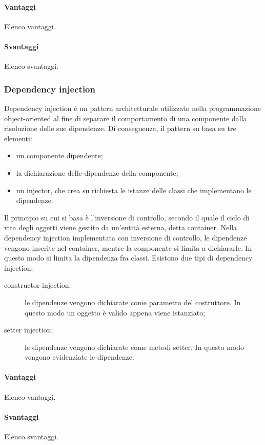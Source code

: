 \documentclass[../SpecificaTecnica.tex]{subfiles}
\begin{document}
				\paragraph{Vantaggi}
					Elenco vantaggi.
				\paragraph{Svantaggi}
					Elenco svantaggi.
			\subsubsection{Dependency injection}
				Dependency injection è un pattern architetturale utilizzato nella programmazione object-oriented al fine di separare il comportamento di una componente dalla risoluzione delle sue dipendenze. Di conseguenza, il pattern su basa su tre elementi:
				\begin{itemize}
					\item un componente dipendente;
					\item la dichiarazione delle dipendenze della componente;
					\item un injector, che crea su richiesta le istanze delle classi che implementano le dipendenze.
				\end{itemize}
				
				Il principio su cui si basa è l'inversione di controllo, secondo il quale il ciclo di vita degli oggetti viene gestito da un'entità esterna, detta container. Nella dependency injection implementata con inversione di controllo, le dipendenze vengono inserite nel container, mentre la componente si limita a dichiararle. In questo modo si limita la dipendenza fra classi. Esistono due tipi di dependency injection:
				
				\begin{description}
					\item[constructor injection:] le dipendenze vengono dichiarate come parametro del costruttore. In questo modo un oggetto è valido appena viene istanziato;
					\item[setter injection:] le dipendenze vengono dichiarate come metodi setter. In questo modo vengono evidenziate le dipendenze.
				\end{description}
				\paragraph{Vantaggi}
					Elenco vantaggi.
				\paragraph{Svantaggi}
					Elenco svantaggi.
\end{document}

